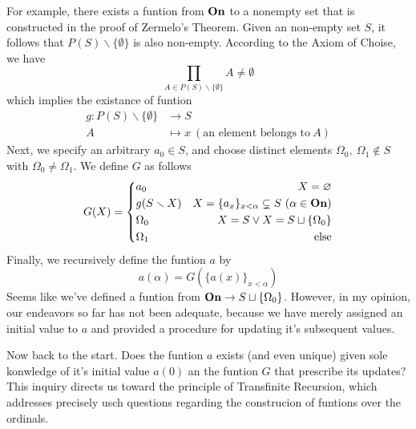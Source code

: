 For example, there exists a funtion from $\boldsymbol{\mathrm{On}}$ to a nonempty set that is constructed in the proof of Zermelo's Theorem. Given an non-empty set $S$, it follows that $P(S) \smallsetminus \{\emptyset\}$ is also non-empty. According to the Axiom of Choise, we have
\[
  \prod_{A \in P(S) \smallsetminus \{ \emptyset \}} A \neq \emptyset
\]
which implies the existance of funtion
\begin{align*}
  g: P(S) \smallsetminus \{ \emptyset \} & \to S \\
  A & \mapsto x \ (\text{an element belongs to}\ A)
\end{align*}
Next, we specify an arbitrary $a_0 \in S$, and choose distinct elements $\Omega_0, \ \Omega_1 \notin S$ with $\Omega_0 \neq \Omega_1$. We define $G$ as follows
\[
  G(X) =
  \left\{
    \begin{aligned}
      & a_0 & X = \varnothing \\
      & g(S \smallsetminus X) & X = \{a_{x}\}_{x < \alpha} \subsetneq S \ (\alpha \in \boldsymbol{\mathrm{On}})\\
      & \Omega_0 & X = S \lor X = S \sqcup \{ \Omega_0 \} \\
      & \Omega_1 & \text{else}
    \end{aligned}
  \right.
\]
Finally, we recursively define the funtion $a$ by
\[
    a(\alpha) = G(\{a(x)\}_{x < \alpha})
\]
Seems like we've defined a funtion from $\boldsymbol{\mathrm{On}} \to S\sqcup \{ \Omega_0 \}$. However, in my opinion, our endeavors so far has not been adequate, 
because we have merely assigned an initial value to $a$ and provided a procedure for updating it's subsequent values.

Now back to the start. Does the funtion $a$ exists (and even unique) 
given sole konwledge of it's initial value $a(0)$ an the funtion $G$ that prescribe its updates? This inquiry directs us toward the principle of Transfinite Recursion, which addresses precisely usch questions regarding the construcion of funtions over the ordinals.








